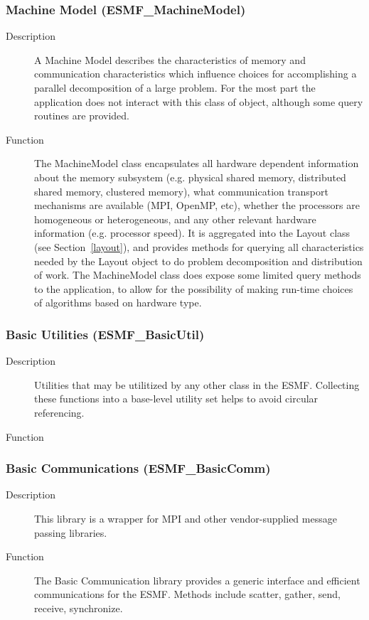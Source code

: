 \subsubsection{Machine Model (ESMF\_MachineModel)}
\label{sec:machinemodel} 
\begin{description}
\item [Description] A Machine Model describes the characteristics of memory and
communication characteristics which influence choices for accomplishing a parallel 
decomposition of a large problem.  For the most part the application does not
interact with this class of object, although some query routines are provided.
\item [Function] The MachineModel class encapsulates all hardware dependent information
about the memory subsystem (e.g. physical shared memory, distributed shared memory, clustered
memory), what communication transport mechanisms are available (MPI, OpenMP, etc), 
whether the processors are homogeneous or heterogeneous, and 
any other relevant hardware information (e.g. processor speed).
It is aggregated into the Layout class (see Section~\ref{layout}), and provides
methods for querying all characteristics needed by the Layout object to do 
problem decomposition and distribution of work.
The MachineModel class does expose some limited query methods to the application, 
to allow for the possibility of making run-time choices of algorithms based on hardware type.
\end{description}

\subsubsection{Basic Utilities (ESMF\_BasicUtil)} 
\begin{description}
\item [Description] Utilities that may be utilitized by any other class in the ESMF.  
Collecting these functions into a base-level utility set helps to 
avoid circular referencing.
\item [Function] 
\end{description}

\subsubsection{Basic Communications (ESMF\_BasicComm)}
\begin{description}
\item [Description] This library is a wrapper for MPI and other vendor-supplied 
message passing libraries.
\item [Function] The Basic Communication library provides a generic interface
and efficient communications for the ESMF.  Methods include scatter, gather, send,
receive, synchronize. 
\end{description}

